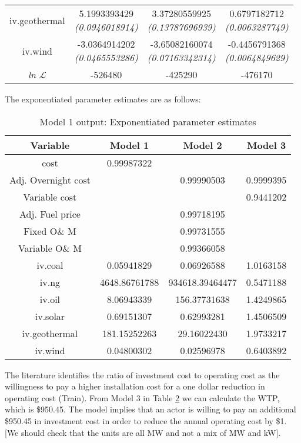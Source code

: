 \documentclass[10pt]{amsart}
\begin{document}
\begin{table}[H]
\begin{tabular}{c c c c}
iv.geothermal & \makecell{5.1993393429 \\ {\footnotesize\textit{(0.0946018914)}}} & \makecell{3.37280559925 \\ {\footnotesize\textit{(0.13787696939)}}} & \makecell{0.6797182712 \\ {\footnotesize\textit{(0.0063287749)}}} \\
iv.wind & \makecell{-3.0364914202 \\ {\footnotesize\textit{(0.0465553286)}}} & \makecell{-3.65082160074 \\ {\footnotesize\textit{(0.07163342314)}}} & \makecell{-0.4456791368 \\ {\footnotesize\textit{(0.0064849629)}}} \\ 
\hline
\textit{ln} $\mathcal{L}$ & -526480 & -425290 & -476170 \\ [1ex]
\hline
\hline
\end{tabular}
\label{table:nl.1}
\end{table}

The exponentiated parameter estimates are as follows:
\begin{table}[H]
\caption{Model 1 output: Exponentiated parameter estimates}
\centering
\begin{tabular}{c c c c}
\hline
\hline
Variable & Model 1 & Model 2 & Model 3\\ [0.5ex]
\hline
cost & 0.99987322 & & \\
Adj. Overnight cost & & 0.99990503 & 0.9999395\\
Variable cost & & & 0.9441202 \\
Adj. Fuel price & & 0.99718195 &\\
Fixed O\& M & & 0.99731555 &\\
Variable O\& M & & 0.99366058 &\\
iv.coal & 0.05941829 & 0.06926588 & 1.0163158 \\
iv.ng & 4648.86761788 & 934618.39464477 & 0.5471188\\
iv.oil & 8.06943339 & 156.37731638 & 1.4249865\\
iv.solar & 0.69151307 & 0.62993281 & 1.4506509\\
iv.geothermal & 181.15252263 & 29.16022430 & 1.9733217\\
iv.wind & 0.04800302 & 0.02596978 & 0.6403892 \\ [1ex]
\hline
\end{tabular}
\label{exponentiated}
\end{table}

The literature identifies the ratio of investment cost to operating cost as the willingness to pay a higher installation cost for a one dollar reduction in operating cost \parencite{}(Train).
From Model 3 in Table \ref{exponentiated} we can calculate the WTP, which is \$950.45.
The model implies that an actor is willing to pay an additional \$950.45 in investment cost in order to reduce the annual operating cost by \$1. 
[We should check that the units are all MW and not a mix of MW and kW].  
\end{document}
